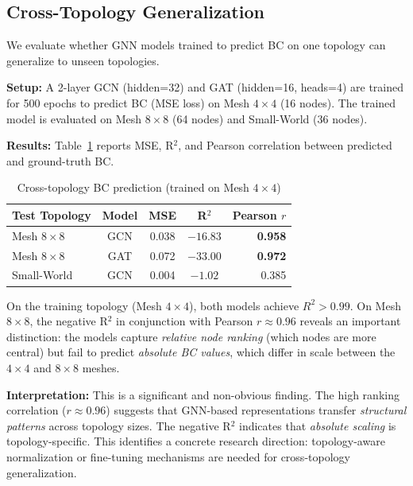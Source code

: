 \documentclass[conference]{IEEEtran}
\begin{document}
\subsection{Cross-Topology Generalization}
\label{sec:results-generalization}

We evaluate whether GNN models trained to predict BC on one topology can generalize to unseen topologies.

\textbf{Setup:} A 2-layer GCN (hidden=32) and GAT (hidden=16, heads=4) are trained for 500 epochs to predict BC (MSE loss) on Mesh $4\times4$ (16 nodes). The trained model is evaluated on Mesh $8\times8$ (64 nodes) and Small-World (36 nodes).

\textbf{Results:} Table~\ref{tab:generalization} reports MSE, R$^2$, and Pearson correlation between predicted and ground-truth BC.

\begin{table}[h]
\centering
\caption{Cross-topology BC prediction (trained on Mesh $4\times4$)}
\label{tab:generalization}
\small
\begin{tabular}{lcccr}
\toprule
\textbf{Test Topology} & \textbf{Model} & \textbf{MSE} & \textbf{R$^2$} & \textbf{Pearson $r$} \\
\midrule
Mesh $8\times8$ & GCN & 0.038 & $-16.83$ & \textbf{0.958} \\
Mesh $8\times8$ & GAT & 0.072 & $-33.00$ & \textbf{0.972} \\
Small-World & GCN & 0.004 & $-1.02$ & 0.385 \\
\bottomrule
\end{tabular}
\end{table}

On the training topology (Mesh $4\times4$), both models achieve $R^2 > 0.99$. On Mesh $8\times8$, the negative R$^2$ in conjunction with Pearson $r \approx 0.96$ reveals an important distinction: the models capture \emph{relative node ranking} (which nodes are more central) but fail to predict \emph{absolute BC values}, which differ in scale between the $4\times4$ and $8\times8$ meshes.

\textbf{Interpretation:} This is a significant and non-obvious finding. The high ranking correlation ($r \approx 0.96$) suggests that GNN-based representations transfer \emph{structural patterns} across topology sizes. The negative R$^2$ indicates that \emph{absolute scaling} is topology-specific. This identifies a concrete research direction: topology-aware normalization or fine-tuning mechanisms are needed for cross-topology generalization.
\end{document}
